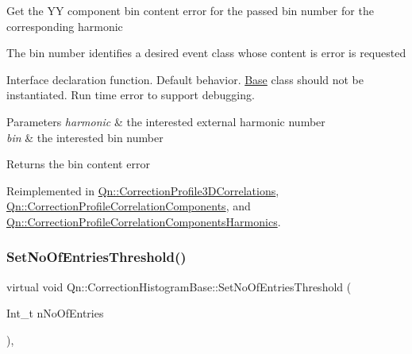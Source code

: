Get the YY component bin content error for the passed bin number for the corresponding harmonic

The bin number identifies a desired event class whose content is error is requested

Interface declaration function. Default behavior. \mbox{\hyperlink{classBase}{Base}} class should not be instantiated. Run time error to support debugging.


\begin{DoxyParams}{Parameters}
{\em harmonic} & the interested external harmonic number \\
\hline
{\em bin} & the interested bin number \\
\hline
\end{DoxyParams}
\begin{DoxyReturn}{Returns}
the bin content error 
\end{DoxyReturn}


Reimplemented in \mbox{\hyperlink{classQn_1_1CorrectionProfile3DCorrelations_a114a4f0454ad223929c3a16504c408aa}{Qn\+::\+Correction\+Profile3\+D\+Correlations}}, \mbox{\hyperlink{classQn_1_1CorrectionProfileCorrelationComponents_a652f4c83e72679161bd7ea35e84a6229}{Qn\+::\+Correction\+Profile\+Correlation\+Components}}, and \mbox{\hyperlink{classQn_1_1CorrectionProfileCorrelationComponentsHarmonics_a66b580c99a004f475f612b0835ff9da1}{Qn\+::\+Correction\+Profile\+Correlation\+Components\+Harmonics}}.

\mbox{\label{classQn_1_1CorrectionHistogramBase_ab398bab718b21e952de6dd84fbaef683}} 
\subsubsection{\texorpdfstring{Set\+No\+Of\+Entries\+Threshold()}{SetNoOfEntriesThreshold()}}
{\footnotesize\ttfamily virtual void Qn\+::\+Correction\+Histogram\+Base\+::\+Set\+No\+Of\+Entries\+Threshold (\begin{DoxyParamCaption}\item[{Int\+\_\+t}]{n\+No\+Of\+Entries }\end{DoxyParamCaption})\hspace{0.3cm}{\ttfamily [inline]}, {\ttfamily [virtual]}}

